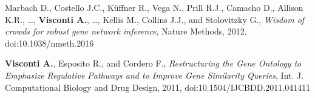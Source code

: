 \begin{itemize}
		 Marbach D., Costello J.C., K\"{u}ffner R., Vega N., Prill R.J., Camacho D., Allison K.R., \dots, \textbf{Visconti A.}, \dots, Kellis M., Collins J.J., and Stolovitzky G.\corresponding, \emph{Wisdom of crowds for robust gene network inference}, Nature Methods, 2012, doi:10.1038/nmeth.2016  

	 \textbf{Visconti A.}\corresponding, Esposito R., and Cordero F., \emph{Restructuring the Gene Ontology to Emphasize Regulative Pathways and to Improve Gene Similarity Queries}, Int. J. Computational Biology and Drug Design, 2011, doi:10.1504/IJCBDD.2011.041411 %

		
 	\end{itemize}
	

\medskip


		
